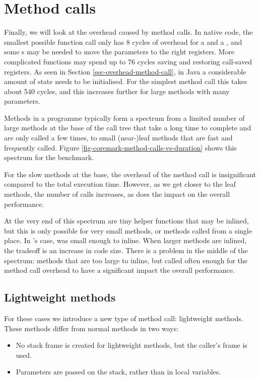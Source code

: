 \section{Method calls}
\label{sec-optimisations-method-calls}

Finally, we will look at the overhead caused by method calls. In native code, the smallest possible function call only has 8 cycles of overhead for a  and a , and some s may be needed to move the parameters to the right registers. More complicated functions may spend up to 76 cycles saving and restoring call-saved registers. As seen in Section \ref{sec-overhead-method-call}, in Java a considerable amount of state needs to be initialised. For the simplest method call this takes about 540 cycles, and this increases further for large methods with many parameters.

Methods in a programme typically form a spectrum from a limited number of large methods at the base of the call tree that take a long time to complete and are only called a few times, to small (near-)leaf methods that are fast and frequently called. Figure \ref{fig-coremark-method-calls-vs-duration} shows this spectrum for the  benchmark.

For the slow methods at the base, the overhead of the method call is insignificant compared to the total execution time. However, as we get closer to the leaf methods, the number of calls increases, as does the impact on the overall performance.

At the very end of this spectrum are tiny helper functions that may be inlined, but this is only possible for very small methods, or methods called from a single place. In 's case,  was small enough to inline. When larger methods are inlined, the tradeoff is an increase in code size. There is a problem in the middle of the spectrum: methods that are too large to inline, but called often enough for the method call overhead to have a significant impact the overall performance.

\subsection{Lightweight methods}
For these cases we introduce a new type of method call: lightweight methods. These methods differ from normal methods in two ways:
\begin{itemize}
	\item No stack frame is created for lightweight methods, but the caller's frame is used.
	\item Parameters are passed on the stack, rather than in local variables.
\end{itemize}


